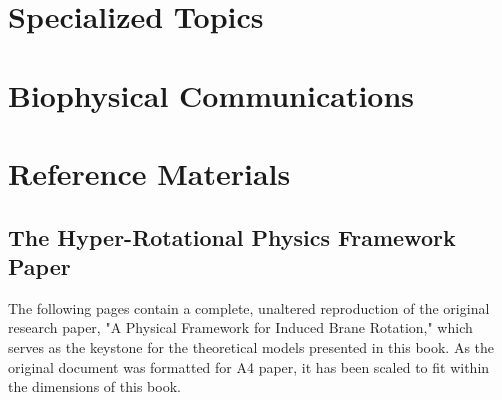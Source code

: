 \documentclass[11pt,twoside,openany]{book}
\begin{document}
\part{Specialized Topics}
% 
% 
% 

\part{Biophysical Communications}
% 
% 
% 
% 
% 
% 
% 
% 
% 
% 

\part{Reference Materials}
% 

\appendix
\chapter{The Hyper-Rotational Physics Framework Paper}

The following pages contain a complete, unaltered reproduction of the original research paper, "A Physical Framework for Induced Brane Rotation," which serves as the keystone for the theoretical models presented in this book. As the original document was formatted for A4 paper, it has been scaled to fit within the dimensions of this book.

\newpage
\end{document}
